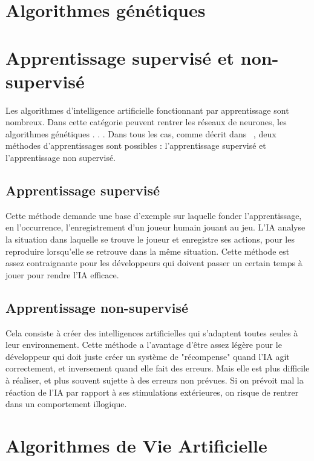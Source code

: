 \documentclass[asi]{picINSA}
\begin{document}
\section{Algorithmes génétiques}
\section{Apprentissage supervisé et non-supervisé}
Les algorithmes d’intelligence artificielle fonctionnant par apprentissage sont nombreux. Dans cette catégorie peuvent rentrer les réseaux de neurones, les algorithmes génétiques . . . Dans tous les cas, comme décrit dans ~\cite{tambellinicomment}, deux méthodes d’apprentissages sont possibles : l’apprentissage supervisé et l’apprentissage non supervisé.

\subsection{Apprentissage supervisé}
Cette méthode demande une base d’exemple sur laquelle fonder l’apprentissage, en l’occurrence, l’enregistrement d’un joueur humain jouant au jeu. L’IA analyse la situation dans laquelle se trouve le joueur et enregistre ses actions, pour les reproduire lorsqu’elle se retrouve dans la même situation. Cette méthode est assez contraignante pour les développeurs qui doivent passer un certain temps à jouer pour rendre l’IA efficace.

\subsection{Apprentissage non-supervisé}
Cela consiste à créer des intelligences artificielles qui s’adaptent toutes seules à leur environnement. Cette méthode a l’avantage d’être assez légère pour le développeur qui doit juste créer un système de "récompense" quand l’IA agit correctement, et inversement  quand elle fait des erreurs. Mais elle est plus difficile à réaliser, et plus souvent sujette à des erreurs non prévues. Si on prévoit mal la réaction de l’IA par rapport à ses stimulations extérieures, on risque de rentrer dans un comportement illogique.
\section{Algorithmes de Vie Artificielle}
  

  
\end{document}
